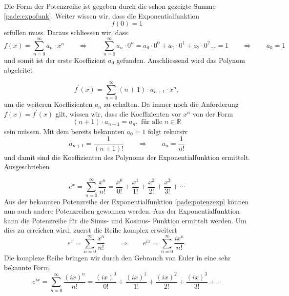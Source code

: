 Die Form der Potenzreihe ist gegeben durch die schon gezeigte Summe \ref{pade:expofunk}.
Weiter wissen wir, dass die Exponentialfunktion 
\begin{equation*}
f(0) = 1
\end{equation*}
erfüllen muss.
Daraus schliessen wir, dass
\begin{equation*}
f(x)=\sum_{n=0}^{\infty} a_{n} \cdot x^{n}
\qquad\Rightarrow\qquad
\sum_{n=0}^{\infty} a_{n} \cdot 0^{n} 
=
a_{0} \cdot 0^{0} + a_{1} \cdot 0^{1} + a_{2} \cdot 0^{2} \dots = 1
\qquad\Rightarrow\qquad
a_{0} = 1
\end{equation*}
und somit ist der erste Koeffizient $a_0$ gefunden.
Anschliessend wird das Polynom abgeleitet

\begin{equation*}
f^{\prime}(x)
=
\sum_{n=0}^{\infty}(n+1) \cdot a_{n+1} \cdot x^{n},
\end{equation*}
um die weiteren Koeffizienten $a_n$ zu erhalten.
Da immer noch die Anforderung $f(x) = f^{\prime}(x)$ gilt, wissen wir, dass die Koeffizienten vor $x^n$  von der Form
\begin{equation*}
(n+1) \cdot a_{n+1} 
= 
a_{n} , \text{ für alle } n \in \mathbb{R}
\end{equation*}
sein müssen. 
Mit dem bereits bekannten $a_0 = 1$ folgt rekursiv
\begin{equation*}
a_{n+1} 
= 
\frac{1}{(n+1)!}
\qquad\Rightarrow\qquad
a_{n} 
= 
\frac{1}{n!}
\end{equation*}
und damit sind die Koeffizienten des Polynoms der Exponentialfunktion ermittelt.
Ausgeschrieben 


\begin{equation}
e^{x}
=
\sum_{n=0}^{\infty} \frac{x^{n}}{n !}
=
\frac{x^{0}}{0 !}+\frac{x^{1}}{1 !}+\frac{x^{2}}{2 !}+\frac{x^{3}}{3 !}+\cdots 
\label{pade:potenzexp}
\end{equation}
Aus der bekannten Potenzreihe der Exponentialfunktion \ref{pade:potenzexp} können nun auch andere Potenzreihen gewonnen werden.
Aus der Exponentialfunktion kann die Potenzreihe für die Sinus- und Kosinus- Funktion ermittelt werden.
Um dies zu erreichen wird, zuerst die Reihe komplex erweitert
\begin{equation*}
e^{x}
=
\sum_{n=0}^{\infty} \frac{x^{n}}{n !}
\qquad\Rightarrow\qquad
e^{ix}
=
\sum_{n=0}^{\infty} \frac{ix^{n}}{n !}.
\end{equation*}
Die komplexe Reihe bringen wir durch den Gebrauch von Euler in eine sehr bekannte Form  
\begin{equation}
e^{ix}
=
\sum_{n=0}^{\infty} \frac{(ix)^{n}}{n !}
=
\frac{(ix)^{0}}{0 !}+\frac{(ix)^{1}}{1 !}+\frac{(ix)^{2}}{2 !}+\frac{(ix)^{3}}{3 !}+\cdots
\end{equation}


